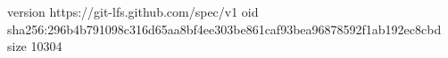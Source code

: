 version https://git-lfs.github.com/spec/v1
oid sha256:296b4b791098c316d65aa8bf4ee303be861caf93bea96878592f1ab192ec8cbd
size 10304

